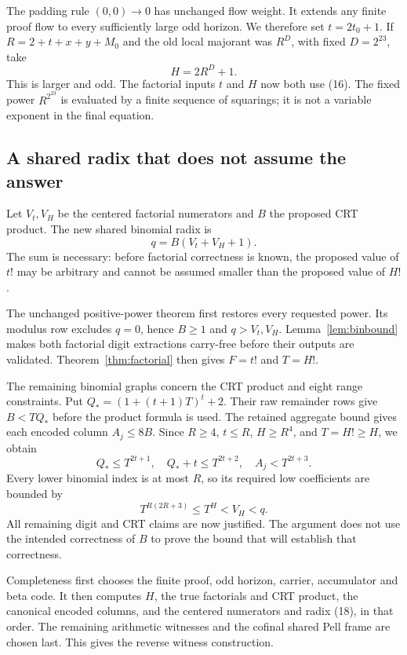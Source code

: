 \documentclass[11pt,letterpaper]{article}
\theoremstyle{definition}\newtheorem{definition}[theorem]{Definition}
\theoremstyle{remark}\newtheorem{remark}[theorem]{Remark}
\begin{document}
The padding rule $(0,0)\to0$ has unchanged flow weight. It extends any finite proof flow to every sufficiently large odd horizon. We therefore set $t=2t_0+1$. If $R=2+t+x+y+M_0$ and the old local majorant was $R^D$, with fixed $D=2^{23}$, take
\[
 H=2R^D+1.
\]
This is larger and odd. The factorial inputs $t$ and $H$ now both use (16). The fixed power $R^{2^{23}}$ is evaluated by a finite sequence of squarings; it is not a variable exponent in the final equation.

\subsection{A shared radix that does not assume the answer}
Let $V_t,V_H$ be the centered factorial numerators and $B$ the proposed CRT product. The new shared binomial radix is
\[
 q=B(V_t+V_H+1).
 \tag{18}\label{eq:radix}
\]
The sum is necessary: before factorial correctness is known, the proposed value of $t!$ may be arbitrary and cannot be assumed smaller than the proposed value of $H!$.

The unchanged positive-power theorem first restores every requested power. Its modulus row excludes $q=0$, hence $B\ge1$ and $q>V_t,V_H$. Lemma~\ref{lem:binbound} makes both factorial digit extractions carry-free before their outputs are validated. Theorem~\ref{thm:factorial} then gives $F=t!$ and $T=H!$.

The remaining binomial graphs concern the CRT product and eight range constraints. Put $Q_*= (1+(t+1)T)^t+2$. Their raw remainder rows give $B<TQ_*$ before the product formula is used. The retained aggregate bound gives each encoded column $A_j\le8B$. Since $R\ge4$, $t\le R$, $H\ge R^4$, and $T=H!\ge H$, we obtain
\[
 Q_*\le T^{2t+1},\quad Q_*+t\le T^{2t+2},\quad
 A_j<T^{2t+3}.
\]
Every lower binomial index is at most $R$, so its required low coefficients are bounded by
\[
 T^{R(2R+3)}\le T^H<V_H<q.
\]
All remaining digit and CRT claims are now justified. The argument does not use the intended correctness of $B$ to prove the bound that will establish that correctness.

Completeness first chooses the finite proof, odd horizon, carrier, accumulator and beta code. It then computes $H$, the true factorials and CRT product, the canonical encoded columns, and the centered numerators and radix (18), in that order. The remaining arithmetic witnesses and the cofinal shared Pell frame are chosen last. This gives the reverse witness construction.
\end{document}
